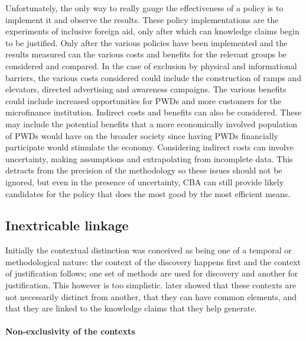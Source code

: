 \documentclass[a4paper]{article}
\begin{document}
Unfortunately, the only way to really gauge the effectiveness of a policy is
to implement it and observe the results. These policy implementations are the
experiments of inclusive foreign aid, only after which can knowledge claims
begin to be justified. Only after the various policies have been implemented
and the results measured can the various costs and benefits for the relevant
groups be considered and compared. In the case of exclusion by physical and
informational barriers, the various costs considered could include the
construction of ramps and elevators, directed advertising and awareness
campaigns. The various benefits could include increased opportunities for PWDs
and more customers for the microfinance institution. Indirect costs and
benefits can also be considered. These may include the potential benefits that
a more economically involved population of PWDs would have on the broader
society since having PWDs financially participate would stimulate the economy.
Considering indirect costs can involve uncertainty, making assumptions and
extrapolating from incomplete data. This detracts from the precision of the
methodology so these issues should not be ignored, but even in the presence of
uncertainty, CBA can still provide likely candidates for the policy that does
the most good by the most efficient means.

\subsection{Inextricable linkage}

Initially the contextual distinction was conceived as being one of a temporal
or methodological nature: the context of the discovery happens first and the
context of justification follows; one set of methods are used for discovery
and another for justification. This however is too simplistic.
\cite{kuhn1970structure} later showed that these contexts are not necessarily
distinct from another, that they can have common elements, and that they are
linked to the knowledge claims that they help generate. 

\paragraph{Non-exclusivity of the contexts}
\label{part}
\end{document}
